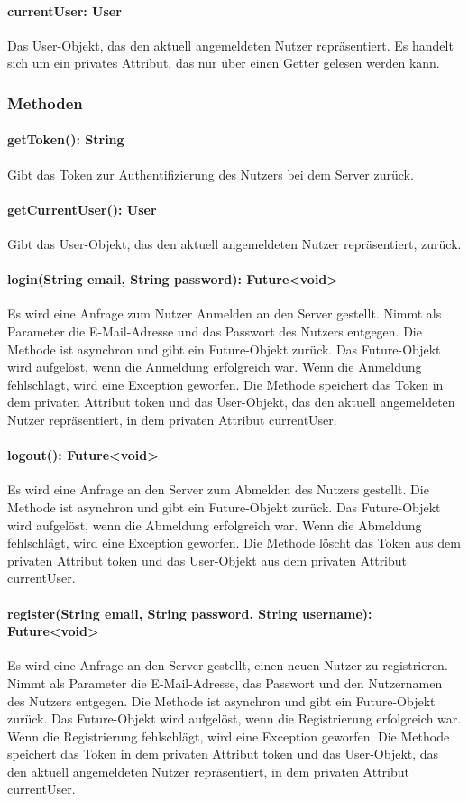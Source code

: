 \documentclass[parskip=full]{scrartcl}
\begin{document}
\paragraph{currentUser: User}
Das User-Objekt, das den aktuell angemeldeten Nutzer repräsentiert. Es handelt sich um ein privates Attribut, das nur über einen Getter gelesen werden kann.
\subsubsection*{Methoden}
\paragraph{getToken(): String}
Gibt das Token zur Authentifizierung des Nutzers bei dem Server zurück.
\paragraph{getCurrentUser(): User}
Gibt das User-Objekt, das den aktuell angemeldeten Nutzer repräsentiert, zurück.
\paragraph{login(String email, String password): Future<void>}
Es wird eine Anfrage zum Nutzer Anmelden an den Server gestellt. Nimmt als Parameter die E-Mail-Adresse und das Passwort des Nutzers entgegen. Die Methode ist asynchron und gibt ein Future-Objekt zurück. Das Future-Objekt wird aufgelöst, wenn die Anmeldung erfolgreich war. Wenn die Anmeldung fehlschlägt, wird eine Exception geworfen. Die Methode speichert das Token in dem privaten Attribut token und das User-Objekt, das den aktuell angemeldeten Nutzer repräsentiert, in dem privaten Attribut currentUser.
\paragraph{logout(): Future<void>}
Es wird eine Anfrage an den Server zum Abmelden des Nutzers gestellt. Die Methode ist asynchron und gibt ein Future-Objekt zurück. Das Future-Objekt wird aufgelöst, wenn die Abmeldung erfolgreich war. Wenn die Abmeldung fehlschlägt, wird eine Exception geworfen. Die Methode löscht das Token aus dem privaten Attribut token und das User-Objekt aus dem privaten Attribut currentUser.
\paragraph{register(String email, String password, String username): Future<void>}
Es wird eine Anfrage an den Server gestellt, einen neuen Nutzer zu registrieren. Nimmt als Parameter die E-Mail-Adresse, das Passwort und den Nutzernamen des Nutzers entgegen. Die Methode ist asynchron und gibt ein Future-Objekt zurück. Das Future-Objekt wird aufgelöst, wenn die Registrierung erfolgreich war. Wenn die Registrierung fehlschlägt, wird eine Exception geworfen. Die Methode speichert das Token in dem privaten Attribut token und das User-Objekt, das den aktuell angemeldeten Nutzer repräsentiert, in dem privaten Attribut currentUser.
\end{document}
